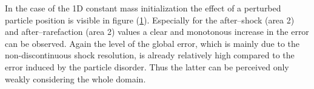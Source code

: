 \documentclass{report}
\begin{document}
In the case of the 1D constant mass initialization the effect of a perturbed particle position is visible in figure (\ref{fig:2DSPHresults_1D_CM_pertStudy}). 
Especially for the after--shock (area 2) and after--rarefaction (area 2) values a clear and monotonous increase in the error can be observed. Again the level of the global error, which is mainly due to the non-discontinuous shock resolution, is already relatively high compared to the error induced by the particle disorder. Thus the latter can be perceived only weakly considering the whole domain.
\begin{figure}[H]
\centering
\label{fig:2DSPHresults_1D_CM_pertStudy}


\end{figure}
\end{document}
